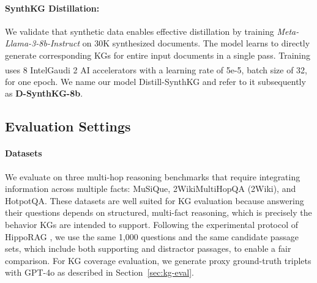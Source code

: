 \documentclass{article} %
\newcommand{\distilledLlama}{\textrm{D-SynthKG-8b}}
\begin{document}
\paragraph{SynthKG Distillation:}
We validate that synthetic data enables effective distillation by training \textit{Meta-Llama-3-8b-Instruct} \citep{llama3modelcard} on 30K synthesized documents. The model learns to directly generate corresponding KGs for entire input documents in a single pass. Training uses 8 Intel\textsuperscript{\textregistered}\space Gaudi 2 AI accelerators with a learning rate of 5e-5, batch size of 32, for one epoch. We name our model Distill-SynthKG and refer to it subsequently as \textbf{\distilledLlama}.


\subsection{Evaluation Settings}
\paragraph{Datasets} 
We evaluate on three multi-hop reasoning benchmarks that require integrating information across multiple facts: MuSiQue, 2WikiMultiHopQA (2Wiki), and HotpotQA. These datasets are well suited for KG evaluation because answering their questions depends on structured, multi-fact reasoning, which is precisely the behavior KGs are intended to support. Following the experimental protocol of HippoRAG \citep{gutiérrez2024hipporag}, we use the same 1,000 questions and the same candidate passage sets, which include both supporting and distractor passages, to enable a fair comparison. For KG coverage evaluation, we generate proxy ground-truth triplets with GPT-4o as described in Section~\ref{sec:kg-eval}.

\end{document}
